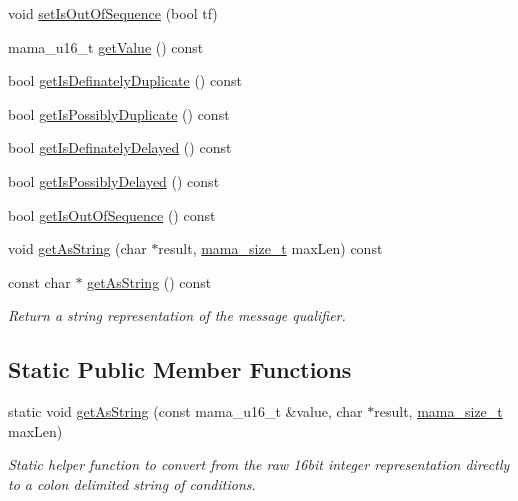 \begin{DoxyCompactItemize}
\item 
void \hyperlink{classWombat_1_1MamaMsgQual_acd4334a4d5b6c0e4fc558182e7f899f5}{setIsOutOfSequence} (bool tf)
\item 
mama\_\-u16\_\-t \hyperlink{classWombat_1_1MamaMsgQual_a3234dc63e2d987863a5c4a423c781e55}{getValue} () const 
\item 
bool \hyperlink{classWombat_1_1MamaMsgQual_a4fadea109baf034c7639e0b31814835d}{getIsDefinatelyDuplicate} () const 
\item 
bool \hyperlink{classWombat_1_1MamaMsgQual_a59ef851d6aef9eecec061704c55ceae6}{getIsPossiblyDuplicate} () const 
\item 
bool \hyperlink{classWombat_1_1MamaMsgQual_ae363d627b79c29e47ed9baa35eba849a}{getIsDefinatelyDelayed} () const 
\item 
bool \hyperlink{classWombat_1_1MamaMsgQual_a8f4ea7ad64fe11870c715660b10f35ee}{getIsPossiblyDelayed} () const 
\item 
bool \hyperlink{classWombat_1_1MamaMsgQual_a84a18ecfd8d1c046233f65379a1f6259}{getIsOutOfSequence} () const 
\item 
void \hyperlink{classWombat_1_1MamaMsgQual_ac69c4a732a33ace286a6ac338b5ebab6}{getAsString} (char $\ast$result, \hyperlink{classmama__size__t}{mama\_\-size\_\-t} maxLen) const 
\item 
const char $\ast$ \hyperlink{classWombat_1_1MamaMsgQual_a96ea56646e8a483883ed685009897163}{getAsString} () const 
\begin{DoxyCompactList}\small\item\em Return a string representation of the message qualifier. \item\end{DoxyCompactList}\end{DoxyCompactItemize}
\subsection*{Static Public Member Functions}
\begin{DoxyCompactItemize}
\item 
static void \hyperlink{classWombat_1_1MamaMsgQual_a41a0a63b5777c6f9937076f0d47fa03f}{getAsString} (const mama\_\-u16\_\-t \&value, char $\ast$result, \hyperlink{classmama__size__t}{mama\_\-size\_\-t} maxLen)
\begin{DoxyCompactList}\small\item\em Static helper function to convert from the raw 16bit integer representation directly to a colon delimited string of conditions. \item\end{DoxyCompactList}\end{DoxyCompactItemize}



